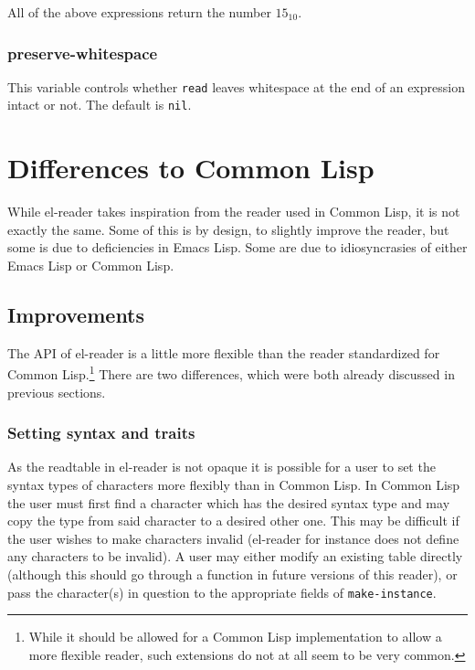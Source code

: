 \documentclass[a4paper,10pt,twoside]{report}
\newcommand{\el}{Emacs Lisp}
\newcommand{\cl}{Common Lisp}
\newcommand{\elr}{el-reader}
\newcommand{\sym}[1]{\texttt{#1}}
\newcommand{\fun}[1]{\texttt{#1}}
\newcommand{\Read}{\fun{read}}
\newcommand{\nil}{\sym{nil}}
\begin{document}
All of the above expressions return the number \(15_{10}\).

\subsubsection{preserve-whitespace}
\label{subsubsec:preserve-whitespace}

This variable controls whether \Read{} leaves whitespace at the end of an
expression intact or not.  The default is \nil{}.

\section{Differences to \cl{}}
\label{sec:cl-differences}

While \elr{} takes inspiration from the reader used in \cl{}, it is not exactly
the same.  Some of this is by design, to slightly improve the reader, but some
is due to deficiencies in \el{}.  Some are due to idiosyncrasies of either \el{}
or \cl{}.

\subsection{Improvements}
\label{subsec:improvements}

The API of \elr{} is a little more flexible than the reader standardized for
\cl{}.\footnote{While it should be allowed for a \cl{} implementation to allow a
more flexible reader, such extensions do not at all seem to be very common.}
There are two differences, which were both already discussed in previous
sections.

\subsubsection{Setting syntax and traits}
\label{subsubsec:set-syntax-traits}

As the readtable in \elr{} is not opaque it is possible for a user to set the
syntax types of characters more flexibly than in \cl{}.  In \cl{} the user must
first find a character which has the desired syntax type and may copy the type
from said character to a desired other one.  This may be difficult if the user
wishes to make characters invalid (\elr{} for instance does not define any
characters to be invalid).  A user may either modify an existing table directly
(although this should go through a function in future versions of this reader),
or pass the character(s) in question to the appropriate fields of
\fun{make-instance}.
\end{document}
